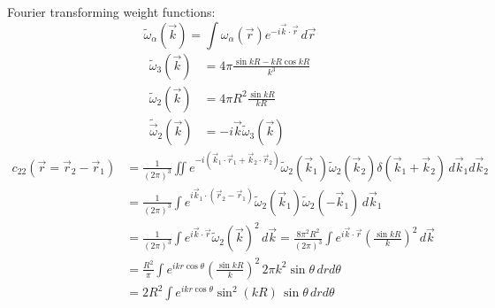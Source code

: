 \documentclass[12pt]{report}
\begin{document}
Fourier transforming weight functions:
\begin{equation}
  \widetilde{\omega}_\alpha(\vec{k}) =
  \int \omega_\alpha (\vec{r}) e^{-i \vec{k}\cdot\vec{r}} \, d\vec{r}
\end{equation}
\begin{align}
  \widetilde{\omega}_3(\vec{k}) &=
  4\pi \frac{\sin{kR} - kR\cos{kR}}{k^3} \\
  \widetilde{\omega}_2(\vec{k}) &=
  4\pi R^2 \frac{\sin{kR}}{kR} \\
  \widetilde{\vec{\omega}}_2(\vec{k}) &=
  - i \vec{k} \widetilde{\omega}_3(\vec{k})
\end{align}
\begin{equation}
  \begin{aligned}
    c_{22}(\vec{r} = \vec{r}_2 - \vec{r}_1) &=
    \frac{1}{(2\pi)^3}
    \iint
    e^{-i (\vec{k}_1\cdot\vec{r}_1 + \vec{k}_2\cdot\vec{r}_2)}
    \widetilde{\omega}_2(\vec{k}_1)
    \widetilde{\omega}_2(\vec{k}_2)
    \delta{(\vec{k}_1 + \vec{k}_2)}
    \, d\vec{k}_1 d\vec{k}_2 \\
    &=
    \frac{1}{(2\pi)^3}
    \int
    e^{i \vec{k}_1 \cdot (\vec{r}_2 - \vec{r}_1)}
    \widetilde{\omega}_2(\vec{k}_1)
    \widetilde{\omega}_2(-\vec{k}_1)
    \, d\vec{k}_1 \\
    &=
    \frac{1}{(2\pi)^3}
    \int
    e^{i \vec{k} \cdot \vec{r}}
    \widetilde{\omega}_2(\vec{k})^2
    \, d\vec{k}
    =
    \frac{8\pi^2 R^2}{(2\pi)^3}
    \int
    e^{i \vec{k} \cdot \vec{r}}
    \left( \frac{\sin{kR}}{k} \right)^2
    \, d\vec{k} \\
    &=
    \frac{R^2}{\pi}
    \int
    e^{i k r \cos\theta}
    \left( \frac{\sin{kR}}{k} \right)^2
    \, 2\pi k^2 \sin\theta \, dr d\theta \\
    &=
    2 R^2
    \int
    e^{i k r \cos\theta}
    \sin^2{(kR)}
    \, \sin\theta \, dr d\theta
  \end{aligned}
\end{equation}
\end{document}

